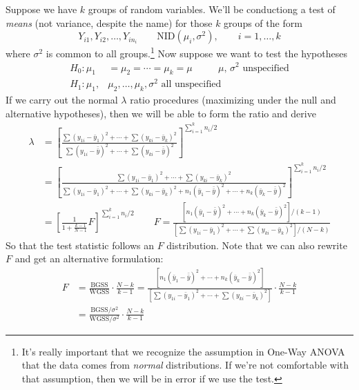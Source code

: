 \documentclass[a4paper,12pt]{scrartcl}
\begin{document}
Suppose we have $k$ groups of random variables. We'll be
conductiong a test of
\emph{means} (not variance, despite the name) for those $k$ groups
of the form
\[ Y_{i1}, Y_{i2}, \ldots, Y_{in_i} \qquad \text{NID}(\mu_i, \sigma^2),
      \qquad i=1, \ldots, k \]
where $\sigma^2$ is common to all groups.\footnote{It's really important
that we recognize the assumption in One-Way ANOVA that the data comes 
from \emph{normal} distributions. If we're not comfortable with that
assumption, then we will be in error if we
use the test.} Now suppose we want to test
the hypotheses
\begin{align*}
   H_0: \mu_1& = \mu_2 = \cdots = \mu_k = \mu \qquad 
      \text{ $\mu$, $\sigma^2$ unspecified} \\
   H_1: \mu_1,& \mu_2, \ldots, \mu_k, \sigma^2 \text{ all unspecified}
\end{align*}
If we carry out the normal $\lambda$ ratio procedures (maximizing 
under the null and alternative hypotheses), then we will be able to 
form the ratio and derive
\begin{align*}
   \lambda &= \left[ \frac{ \sum (y_{1i} - \bar{y}_1)^2 + \cdots +
      \sum (y_{ki} - \bar{y}_k)^2}{
      \sum (y_{1i} - \bar{\bar{y}})^2 + \cdots +
      \sum (y_{ki} - \bar{\bar{y}})^2}\right]^{\sum_{i=1}^k n_i/2}\\
   &= \left[ \frac{ \sum (y_{1i} - \bar{y}_1)^2 + \cdots +
      \sum (y_{ki} - \bar{y}_k)^2}{
      \sum (y_{1i} - \bar{y}_1)^2 + \cdots +
      \sum (y_{ki} - \bar{y}_k)^2
      + n_1(\bar{y}_1 - \bar{\bar{y}})^2 + \cdots 
      + n_k(\bar{y}_k - \bar{\bar{y}})^2
      }\right]^{\sum_{i=1}^k n_i/2}\\
   &= \left[ \frac{1}{1+ \frac{k-1}{N-1}} F\right]^{\sum_{i=1}^k n_i/2}
   \qquad F = \frac{ [n_1(\bar{y}_1 - \bar{\bar{y}})^2 + \cdots 
      + n_k(\bar{y}_k - \bar{\bar{y}})^2]/(k-1)}{
      \left[\sum (y_{1i} - \bar{y}_1)^2 + \cdots +
      \sum (y_{ki} - \bar{y}_k)^2\right]/(N-k)}
\end{align*}
So that the test statistic follows an $F$ distribution. Note that
we can also rewrite $F$ and get an alternative formulation:
\begin{align}
    F &= \frac{\text{BGSS}}{\text{WGSS}} \cdot
      \frac{N-k}{k-1} = 
      \frac{ [n_1(\bar{y}_1 - \bar{\bar{y}})^2 + \cdots 
      + n_k(\bar{y}_k - \bar{\bar{y}})^2]}{
      \left[\sum (y_{1i} - \bar{y}_1)^2 + \cdots +
      \sum (y_{ki} - \bar{y}_k)^2\right]} \cdot 
      \frac{N-k}{k-1} \label{decomp}\\
   &= \frac{ \text{BGSS}/\sigma^2}{
      \text{WGSS}/\sigma^2} \cdot 
      \frac{N-k}{k-1} \label{anovachi}
   \end{align}
\end{document}
